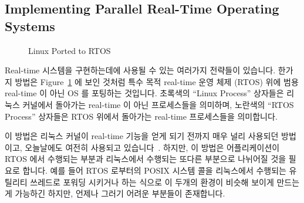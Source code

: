 \subsection{Implementing Parallel Real-Time Operating Systems}
\label{sec:rt:Implementing Parallel Real-Time Operating Systems}

\begin{figure}[tb]
\centering
{}
\caption{Linux Ported to RTOS}
\label{fig:rt:Linux Ported to RTOS}
\end{figure}

Real-time 시스템을 구현하는데에 사용될 수 있는 여러가지 전략들이 있습니다.
한가지 방법은
Figure~\ref{fig:rt:Linux Ported to RTOS} 에 보인 것처럼 특수 목적 real-time
운영 체제 (RTOS) 위에 범용 real-time 이 아닌 OS 를 포팅하는 것입니다.
초록색의 ``Linux Process'' 상자들은 리눅스 커널에서 돌아가는 real-time 이 아닌
프로세스들을 의미하며, 노란색의 ``RTOS Process'' 상자들은 RTOS 위에서 돌아가는
real-time 프로세스들을 의미합니다.

이 방법은 리눅스 커널이 real-time 기능을 얻게 되기 전까지 매우 널리 사용되던
방법이고, 오늘날에도 여전히 사용되고
있습니다~\cite{Xenomai2014,VictorYodaiken2004a}.
하지만, 이 방법은 어플리케이션이 RTOS 에서 수행되는 부분과 리눅스에서 수행되는
또다른 부분으로 나뉘어질 것을 필요로 합니다.
예를 들어 RTOS 로부터의 POSIX 시스템 콜을 리눅스에서 수행되는 유틸리티 쓰레드로
포워딩 시키거나 하는 식으로 이 두개의 환경이 비슷해 보이게 만드는게 가능하긴
하지만, 언제나 그러기 어려운 부분들이 존재합니다.

